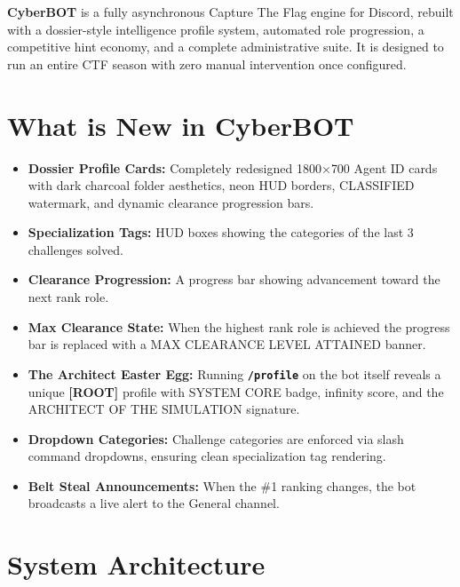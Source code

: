 \documentclass[12pt,a4paper]{report}
\newcommand{\cmd}[1]{\texttt{\color{cybercyan}\textbf{#1}}}
\begin{document}
\textbf{CyberBOT} is a fully asynchronous Capture The Flag engine for Discord, rebuilt with a
dossier-style intelligence profile system, automated role progression, a competitive hint economy,
and a complete administrative suite. It is designed to run an entire CTF season with zero manual
intervention once configured.

\section{What is New in CyberBOT}

\begin{itemize}
    \item \textbf{Dossier Profile Cards:} Completely redesigned 1800$\times$700 Agent ID cards with dark
          charcoal folder aesthetics, neon HUD borders, CLASSIFIED watermark, and dynamic clearance
          progression bars.
    \item \textbf{Specialization Tags:} HUD boxes showing the categories of the last 3 challenges solved.
    \item \textbf{Clearance Progression:} A progress bar showing advancement toward the next rank role.
    \item \textbf{Max Clearance State:} When the highest rank role is achieved the progress bar is replaced
          with a MAX CLEARANCE LEVEL ATTAINED banner.
    \item \textbf{The Architect Easter Egg:} Running \cmd{/profile} on the bot itself reveals a unique
          \textbf{[ROOT]} profile with SYSTEM CORE badge, infinity score, and the ARCHITECT OF THE
          SIMULATION signature.
    \item \textbf{Dropdown Categories:} Challenge categories are enforced via slash command dropdowns,
          ensuring clean specialization tag rendering.
    \item \textbf{Belt Steal Announcements:} When the \#1 ranking changes, the bot broadcasts a live
          alert to the General channel.
\end{itemize}

\newpage
\section{System Architecture}
\end{document}
